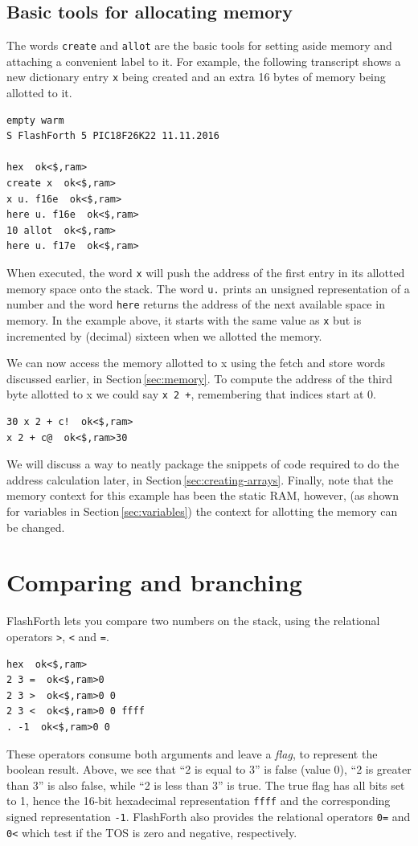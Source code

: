 \documentclass[12pt,a4paper]{article}
\begin{document}
\subsection{Basic tools for allocating memory}
\label{sec:allocating-memory}
%
The words \verb!create! and \verb!allot! are the basic tools for setting aside memory
and attaching a convenient label to it.
For example, the following transcript shows a new dictionary entry \verb!x! being created 
and an extra 16 bytes of memory being allotted to it.
\begin{verbatim}
empty warm 
S FlashForth 5 PIC18F26K22 11.11.2016

hex  ok<$,ram>
create x  ok<$,ram>
x u. f16e  ok<$,ram>
here u. f16e  ok<$,ram>
10 allot  ok<$,ram>
here u. f17e  ok<$,ram>
\end{verbatim}
When executed, the word \verb!x! will push the address of the first entry 
in its allotted memory space onto the stack.
The word \verb!u.! prints an unsigned representation of a number and 
the word \verb!here! returns the address of the next available space in memory.
In the example above, it starts with the same value as \verb!x! but is incremented 
by (decimal) sixteen when we allotted the memory.

\medskip
We can now access the memory allotted to x using the fetch and store words 
discussed earlier, in Section\,\ref{sec:memory}.
To compute the address of the third byte allotted to x we could say \verb!x 2 +!,
remembering that indices start at 0.
\begin{verbatim}
30 x 2 + c!  ok<$,ram>
x 2 + c@  ok<$,ram>30 
\end{verbatim}
We will discuss a way to neatly package the snippets of code required to do the address
calculation later, in Section\,\ref{sec:creating-arrays}.
Finally, note that the memory context for this example has been the static RAM, however, 
(as shown for variables in Section\,\ref{sec:variables})
the context for allotting the memory can be changed.


\newpage
\section{Comparing and branching}
\label{sec:comparing-branching}
%
FlashForth lets you compare two numbers on the stack, using the relational
operators \verb!>!, \verb!<! and \verb!=!.
\begin{verbatim}
hex  ok<$,ram>
2 3 =  ok<$,ram>0 
2 3 >  ok<$,ram>0 0 
2 3 <  ok<$,ram>0 0 ffff 
. -1  ok<$,ram>0 0 
\end{verbatim}
These operators consume both arguments and leave a \textit{flag}, 
to represent the boolean result.
Above, we see that ``2 is equal to 3'' is false (value 0),
``2 is greater than 3'' is also false, while
``2 is less than 3'' is true.
The true flag has all bits set to 1, hence the 16-bit hexadecimal representation \verb!ffff!
and the corresponding signed representation \verb!-1!.
FlashForth also provides the relational operators \verb!0=! and \verb!0<!
which test if the TOS is zero and negative, respectively.
\end{document}
